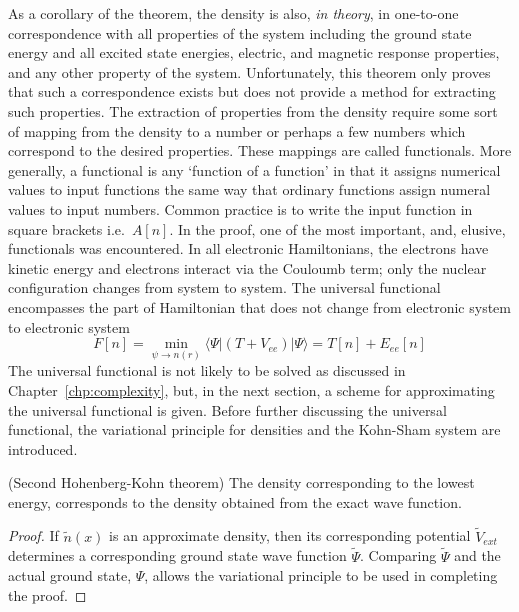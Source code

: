 \documentclass[11pt,oneside,final]{huthesis}%
\begin{document}
As a corollary of the theorem, the density is also, \emph{in theory}, in one-to-one correspondence with all properties of the system including the ground state energy and all excited state energies, electric, and magnetic response properties, and any other property of the system. Unfortunately, this theorem only proves that such a correspondence exists but does not provide a method for extracting such properties.  The extraction of properties from the density require some sort of mapping from the density to a number or perhaps a few numbers which correspond to the desired properties.  These mappings are called {functionals}.  More generally, a functional is any `function of a function' in that it assigns numerical values to input functions the same way that ordinary functions assign numeral values to input numbers.  Common practice is to write the input function in square brackets i.e.~$A[n]$.  In the proof, one of the most important, and, elusive, functionals was encountered.  In all electronic Hamiltonians, the electrons have kinetic energy and electrons interact via the Couloumb term; only the nuclear configuration changes from system to system.  The {universal functional} encompasses the part of Hamiltonian that does not change from electronic system to electronic system
\begin{equation}
F[n]=\min_{\psi\rightarrow n(r)}\langle \Psi| (T+V_{ee}) |\Psi\rangle=T[n]+E_{ee}[n]
\end{equation}
The universal functional is not likely to be solved as discussed in Chapter~\ref{chp:complexity}, but, in the next section, a scheme for approximating the universal functional is given.  Before further discussing the universal functional, the variational principle for densities and the Kohn-Sham system are introduced.

\begin{theorem}(Second Hohenberg-Kohn theorem) The density corresponding to the lowest energy, corresponds to the density obtained from the exact wave function.\end{theorem}
	\begin{proof} If $\tilde{n}(x)$ is an approximate density, then its corresponding potential $\tilde{V}_{ext}$ determines a corresponding ground state wave function $\tilde{\Psi}$.  Comparing $\tilde{\Psi}$ and the actual ground state, $\Psi$, allows the variational principle  to be used in completing the proof.\end{proof}
\end{document}
